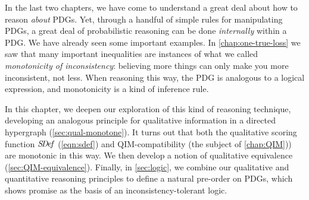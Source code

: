     \label{chap:reason}

In the last two chapters, we have come to understand a great deal about how to reason \emph{about} PDGs.
Yet, through a handful of simple rules for manipulating PDGs, a great deal of probabilistic reasoning can be done \emph{internally} within a PDG.  
We have already seen some important examples.
In \cref{chap:one-true-loss} we saw that many important inequalities are instances of what we called \emph{monotonicity of inconsistency}: believing more things can only make you more inconsistent, not less.
When reasoning this way, the PDG is analogous to a logical expression, and monotonicity is a kind of inference rule. 

In this chapter, we deepen our exploration of this kind of reasoning technique, developing an analogous principle for qualitative information in a directed hypergraph (\cref{sec:qual-monotone}).
It turns out that both the qualitative scoring function $\mathit{S\mskip-3.5muD\mskip-2.5mue\mskip-1.5muf}$ (\eqref{eqn:sdef}) and QIM-compatibility (the subject of \cref{chap:QIM})) are monotonic in this way. 
We then develop a notion of qualitative equivalence (\cref{sec:QIM-equivalence}).
Finally, in \cref{sec:logic}, we combine our qualitative and quantitative reasoning principles to define a natural pre-order on PDGs, which shows promise as the basis of an inconsistency-tolerant logic. 

    
